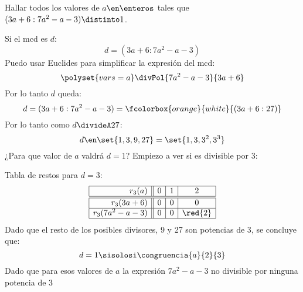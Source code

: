 \begin{enunciado}{\ejExtra}
	Hallar todos los valores de $a \en \enteros$ tales que $(3a+6 : 7a^2 - a -3) \distinto 1$.
\end{enunciado}
Si el mcd es $d$:
$$
	d = (3a+6 : 7a^2 - a -3)
$$
Puedo usar Euclides para simplificar la expresión del mcd:
$$
	\polyset{vars=a}
	\divPol{7a^2-a-3}{3a+6}
$$
Por lo tanto $d$ queda:
$$
	d = (3a+6 : 7a^2 - a -3) =
	\fcolorbox{orange}{white}{(3a + 6 : 27)}
$$
Por lo tanto como $d \divideA 27$:
$$
    d \en \set{1,3,9,27} = \set{1,3,3^2, 3^3}
$$
¿Para que valor de $a$ valdrá  $d=1$? Empiezo a ver si es divisible por 3:

Tabla de restos para $d = 3$:
$$
	\begin{array}{|r||c|c|c|}
		\hline
		r_3(a)            & 0 & 1 & 2       \\ \hline\hline
		r_3(3a+6)         & 0 & 0 & 0       \\ \hline
		r_3(7a^2 - a - 3) & 0 & 0 & \red{2} \\ \hline
	\end{array}
$$
Dado que el resto de los posibles divisores, 9 y 27 son potencias de 3, se concluye que:
$$
	d = 1 \sisolosi \congruencia{a}{2}{3}
$$
Dado que para esos valores de $a$ la expresión $7a^2-a-3$ no divisible por ninguna potencia de 3

\begin{aportes}
	\item {}
\end{aportes}

